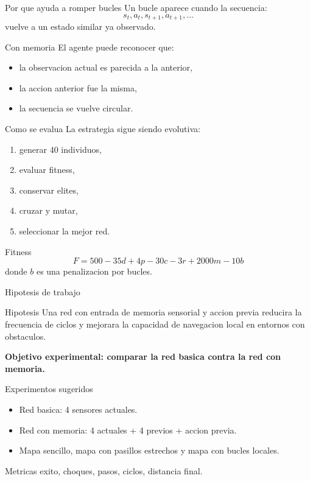 \documentclass[aspectratio=169,11pt]{beamer}
\begin{document}
\begin{frame}{Por que ayuda a romper bucles}
  Un bucle aparece cuando la secuencia:
  \[
  s_t, a_t, s_{t+1}, a_{t+1}, \dots
  \]
  vuelve a un estado similar ya observado.
  \begin{block}{Con memoria}
    El agente puede reconocer que:
    \begin{itemize}
      \item la observacion actual es parecida a la anterior,
      \item la accion anterior fue la misma,
      \item la secuencia se vuelve circular.
    \end{itemize}
  \end{block}
\end{frame}

\begin{frame}{Como se evalua}
  La estrategia sigue siendo evolutiva:
  \begin{enumerate}
    \item generar 40 individuos,
    \item evaluar fitness,
    \item conservar elites,
    \item cruzar y mutar,
    \item seleccionar la mejor red.
  \end{enumerate}
  \vspace{0.2cm}
  \begin{block}{Fitness}
    \[
    F = 500 - 35d + 4p - 30c - 3r + 2000m - 10b
    \]
    donde $b$ es una penalizacion por bucles.
  \end{block}
\end{frame}

\begin{frame}{Hipotesis de trabajo}
  \begin{block}{Hipotesis}
    Una red con entrada de memoria sensorial y accion previa reducira la frecuencia de ciclos y mejorara la capacidad de navegacion local en entornos con obstaculos.
  \end{block}
  \vspace{0.25cm}
  \begin{center}
    \textbf{Objetivo experimental: comparar la red basica contra la red con memoria.}
  \end{center}
\end{frame}

\begin{frame}{Experimentos sugeridos}
  \begin{itemize}
    \item Red basica: 4 sensores actuales.
    \item Red con memoria: 4 actuales + 4 previos + accion previa.
    \item Mapa sencillo, mapa con pasillos estrechos y mapa con bucles locales.
  \end{itemize}
  \vspace{0.3cm}
  \begin{block}{Metricas}
    exito, choques, pasos, ciclos, distancia final.
  \end{block}
\end{frame}
\end{document}
